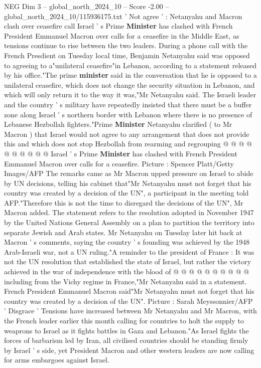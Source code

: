 \begin{textsample}{NEG Dim 3 – global\_north\_2024\_10 – Score -2.00 – global\_north\_2024\_10/115936175.txt}  \label{ex:f3_neg_328}
' Not agree ' : Netanyahu and Macron clash over ceasefire call Israel ' s Prime \textbf{Minister} has clashed with French President Emmanuel Macron over calls for a ceasefire in the Middle East, as tensions continue to rise between the two leaders.
During a phone call with the French Presdient on Tuesday local time, Benjamin Netanyahu said was opposed to agreeing to a"unilateral ceasefire"in Lebanon, according to a statement released by his office."The prime \textbf{minister} said in the conversation that he is opposed to a unilateral ceasefire, which does not change the security situation in Lebanon, and which will only return it to the way it was,"Mr Netanyahu said.
The Israeli leader and the country ' s military have repeatedly insisted that there must be a buffer zone along Israel ' s northern border with Lebanon where there is no presence of Lebanese Hezbollah fighters."Prime \textbf{Minister} Netanyahu clarified ( to Mr Macron ) that Israel would not agree to any arrangement that does not provide this and which does not stop Hezbollah from rearming and regrouping @ @ @ @ @ @ @ @ @ @ Israel ' s Prime \textbf{Minister} has clashed with French President Emmanuel Macron over calls for a ceasefire.
Picture : Spencer Platt/Getty Images/AFP The remarks came as Mr Macron upped pressure on Israel to abide by UN decisions, telling his cabinet that"Mr Netanyahu must not forget that his country was created by a decision of the UN", a participant in the meeting told AFP."Therefore this is not the time to disregard the decisions of the UN", Mr Macron added.
The statement refers to the resolution adopted in November 1947 by the United Nations General Assembly on a plan to partition the territory into separate Jewish and Arab states.
Mr Netanyahu on Tuesday later hit back at Macron ' s comments, saying the country ' s founding was achieved by the 1948 Arab-Israeli war, not a UN ruling."A reminder to the president of France : It was not the UN resolution that established the state of Israel, but rather the victory achieved in the war of independence with the blood of @ @ @ @ @ @ @ @ @ @ including from the Vichy regime in France,"Mr Netanyahu said in a statement.
French President Emmanuel Macron said"Mr Netanyahu must not forget that his country was created by a decision of the UN".
Picture : Sarah Meyssonnier/AFP ' Disgrace ' Tensions have increased between Mr Netanyahu and Mr Macron, with the French leader earlier this month calling for countries to holt the supply to weaprons to Israel as it fights battles in Gaza and Lebanon."As Israel fights the forces of barbarism led by Iran, all civilised countries should be standing firmly by Israel ' s side, yet President Macron and other western leaders are now calling for arms embargoes against Israel.

\end{textsample}
